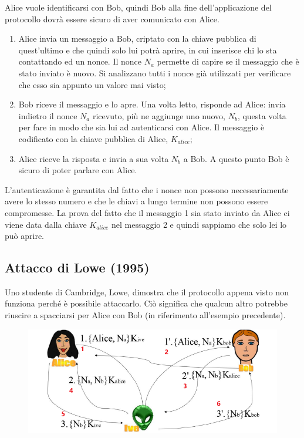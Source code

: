 Alice vuole identificarsi con Bob, quindi Bob alla fine dell'applicazione del protocollo dovrà essere
sicuro di aver comunicato con Alice.
\begin{enumerate}
    \item Alice invia un messaggio a Bob, criptato con la
          chiave pubblica di quest'ultimo e che quindi solo lui potrà aprire, in cui inserisce chi lo sta contattando ed un nonce. Il nonce \(N_a\) permette di capire se il messaggio che è stato inviato è nuovo. Si analizzano tutti i nonce già utilizzati per verificare che esso sia appunto un valore mai visto;
    \item Bob riceve il messaggio e lo apre. Una volta
          letto, risponde ad Alice: invia indietro il nonce
          \(N_a\) ricevuto, più ne aggiunge uno nuovo,  \(N_b\), questa volta per fare in modo che sia lui ad autenticarsi con Alice. Il messaggio è codificato con la chiave pubblica di Alice, \(K_{alice}\);
    \item Alice riceve la risposta e invia a sua volta
          \(N_b\) a Bob. A questo punto Bob è sicuro di poter
          parlare con Alice.
\end{enumerate}

L'autenticazione è garantita dal fatto che i nonce non
possono necessariamente avere lo stesso
numero e che le chiavi a lungo termine non possono
essere compromesse.
La prova del fatto che il messaggio 1 sia stato inviato
da Alice ci viene data dalla chiave \(K_{alice}\) nel
messaggio 2 e quindi sappiamo che solo lei lo può aprire.

\subsection{Attacco di Lowe (1995)}

Uno studente di Cambridge, Lowe, dimostra che il protocollo appena visto non
funziona perché è possibile attaccarlo. Ciò significa che qualcun altro potrebbe
riuscire a spacciarsi per Alice con Bob (in riferimento all'esempio precedente).

\begin{figure}[H]
    \centering
    \includegraphics[width=\textwidth, keepaspectratio]{capitoli/crittografia/imgs/alienospinning.png}
\end{figure}

